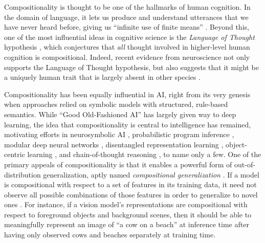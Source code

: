 \documentclass{article}
\begin{document}
Compositionality is thought to be one of the hallmarks of human cognition. In the domain of language, it lets us produce and understand utterances that we have never heard before, giving us ``infinite use of finite means'' \citep{chomsky1956three}. Beyond this, one of the most influential ideas in cognitive science is the \textit{Language of Thought} hypothesis \citep{fodor1975language,quilty2023best}, which conjectures that \emph{all} thought involved in higher-level human cognition is compositional. Indeed, recent evidence from neuroscience not only supports the Language of Thought hypothesis, but also suggests that it might be a uniquely human trait that is largely absent in other species \citep{dehaene_symbols_2022}.

Compositionality has been equally influential in AI, right from its very genesis when approaches relied on symbolic models with structured, rule-based semantics. While ``Good Old-Fashioned AI'' has largely given way to deep learning, the idea that compositionality is central to intelligence has remained, motivating efforts in neurosymbolic AI \citep{garcez2023neurosymbolic,sheth2023neurosymbolic,marcus2003algebraic}, probabilistic program inference \citep{lake2017building,ellis2003dreamcoder}, modular deep neural networks \citet{bengio2017consciousness,goyal2022inductive,pfeiffer2023modular,andreas2016neural,alias2021neural,goyal2020object,schug2024discovering}, disentangled representation learning \citep{higgins2017betavae,lachapelle2022disentanglement,ahuja2022weakly,brehmer2022weakly,lippe2022citris,sawada2018disentangling}, object-centric learning \citep{locatello2020object,singh2023neural,wu2024neural}, and chain-of-thought reasoning \citep{wei2022chain,kojima2022large,hu2024amortizing}, to name only a few. One of the primary appeals of compositionality is that it enables a powerful form of out-of-distribution generalization, aptly named \textit{compositional generalization} \citep{lake2018generalization}. If a model is compositional with respect to a set of features in its training data, it need not observe all possible combinations of those features in order to generalize to novel ones \citep{schug2024discovering,wiedemer2024provable,wiedemer2023compositional,bahdanau2018systematic,mittal2021compositional}. For instance, if a vision model's representations are compositional with respect to foreground objects and background scenes, then it should be able to meaningfully represent an image of ``a cow on a beach'' at inference time after having only observed cows and beaches separately at training time.
\end{document}
